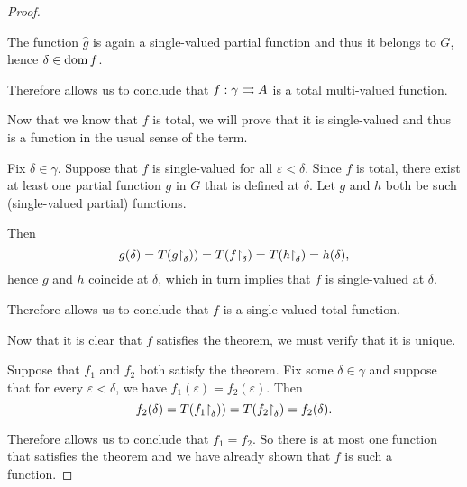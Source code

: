 \begin{proof}
\begin{itemize}
    The function \( \widehat g \) is again a single-valued partial function and thus it belongs to \( G \), hence \( \delta \in \operatorname{dom} f \).
  \end{itemize}

  Therefore  allows us to conclude that \( f: \gamma \rightrightarrows A \) is a total multi-valued function.

   Now that we know that \( f \) is total, we will prove that it is single-valued and thus is a function in the usual sense of the term.

  Fix \( \delta \in \gamma \). Suppose that \( f \) is single-valued for all \( \varepsilon < \delta \). Since \( f \) is total, there exist at least one partial function \( g \) in \( G \) that is defined at \( \delta \). Let \( g \) and \( h \) both be such (single-valued partial) functions.

  Then
  \begin{equation*}
    g(\delta) = T(g{\upharpoonright}_\delta)) = T(f{\upharpoonright}_\delta) = T(h{\upharpoonright}_\delta) = h(\delta),
  \end{equation*}
  hence \( g \) and \( h \) coincide at \( \delta \), which in turn implies that \( f \) is single-valued at \( \delta \).

  Therefore  allows us to conclude that \( f \) is a single-valued total function.

   Now that it is clear that \( f \) satisfies the theorem, we must verify that it is unique.

  Suppose that \( f_1 \) and \( f_2 \) both satisfy the theorem. Fix some \( \delta \in \gamma \) and suppose that for every \( \varepsilon < \delta \), we have \( f_1(\varepsilon) = f_2(\varepsilon) \). Then
  \begin{equation*}
    f_2(\delta) = T(f_1{\upharpoonright}_\delta)) = T(f_2{\upharpoonright}_\delta) = f_2(\delta).
  \end{equation*}

  Therefore  allows us to conclude that \( f_1 = f_2 \). So there is at most one function that satisfies the theorem and we have already shown that \( f \) is such a function.
\end{proof}

